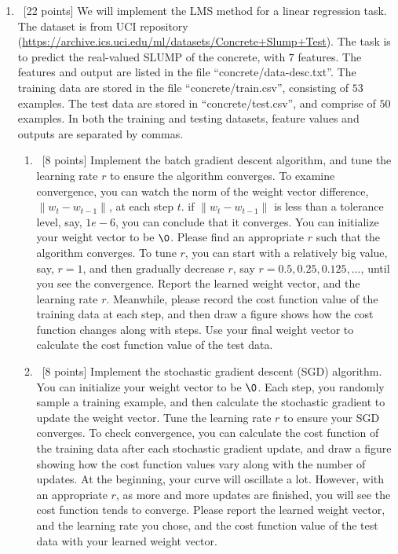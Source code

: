 \documentclass[12pt, fullpage,letterpaper]{article}
\begin{document}
\begin{enumerate}
	\item~[22 points] We will implement the LMS method for a linear regression task. The dataset is from UCI repository (\url{https://archive.ics.uci.edu/ml/datasets/Concrete+Slump+Test}). The task is to predict the real-valued SLUMP of the concrete, with $7$ features. The features and output are listed in the file ``concrete/data-desc.txt''. The training data are stored in the file ``concrete/train.csv'', consisting of $53$ examples. The test data are stored in ``concrete/test.csv'', and comprise of $50$ examples. In both the training and testing datasets, feature values and outputs are separated by commas. 
	
	\begin{enumerate}
		\item~[8 points] Implement the batch gradient descent algorithm, and tune the learning rate $r$ to ensure the algorithm converges.  To examine convergence, you can watch the norm of the weight vector difference,  $\|w_{t} - w_{t-1}\|$,  at each step $t$.  if $\|w_{t} - w_{t-1}\|$ is  less than a tolerance level, say, $1e-6$, you can conclude that it converges. You can initialize your weight vector to be $\0$.  Please find an appropriate $r$ such that the algorithm converges. To tune $r$, you can start with a relatively big value, say, $r=1$, and then gradually decrease $r$, say $r=0.5, 0.25, 0.125, \ldots$, until you see the convergence. 
		Report the learned weight vector, and the learning rate $r$. Meanwhile, please record the cost function  value of the training data at each step, and then draw a figure shows how the cost function changes along with steps. Use your final weight vector to calculate  the cost function value of the test data. 
		\item~[8 points] Implement the stochastic gradient descent (SGD) algorithm. You can initialize your weight vector to be $\0$. Each step, you randomly sample a training example, and then calculate the stochastic gradient to update the weight vector.  Tune the learning rate $r$ to ensure your SGD converges. To check convergence, you can calculate the cost function of the training data after each stochastic gradient update, and draw a figure showing how the cost function values vary along with the number of updates. At the beginning, your curve will oscillate a lot. However, with an appropriate $r$, as more and more updates are finished, you will see the cost function tends to converge. Please report the learned weight vector, and the learning rate you chose, and the cost function value of the test data with your learned weight vector.   

\end{enumerate}
\end{enumerate}
\end{document}
